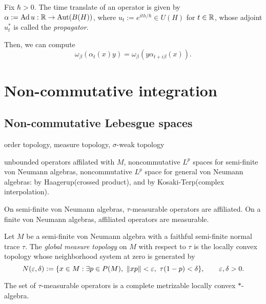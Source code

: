 \documentclass{../../large}
\begin{document}
Fix $\hbar>0$.
The time translate of an operator is given by $\alpha:=\operatorname{Ad} u:\mathbb{R}\to\operatorname{Aut}(B(H))$, where $u_t:=e^{ith/\hbar}\in U(H)$ for $t\in\mathbb{R}$, whose adjoint $u_t^*$ is called the \emph{propagator}.

Then, we can compute
\[\omega_\beta(\alpha_t(x)y)=\omega_\beta(y\alpha_{t+i\beta}(x)).\]










\chapter{Non-commutative integration}





\section{Non-commutative Lebesgue spaces}





\begin{prb}


order topology, measure topology, $\sigma$-weak topology


unbounded operators affilated with $M$,
noncommutative $L^p$ spaces for semi-finite von Neumann algebras,
noncommutative $L^p$ space for general von Neumann algebras: by Haagerup(crossed product), and by Kosaki-Terp(complex interpolation).

On semi-finite von Neumann algebras, $\tau$-measurable operators are affiliated.
On a finite von Neumann algebras, affiliated operators are measurable.


\end{prb}

\begin{prb}
Let $M$ be a semi-finite von Neumann algebra with a faithful semi-finite normal trace $\tau$.
The \emph{global measure topology} on $M$ with respect to $\tau$ is the locally convex topology whose neighborhood system at zero is generated by
\[N(\e,\delta):=\{x\in M:\exists p\in P(M),\ \|xp\|<\e,\ \tau(1-p)<\delta\},\qquad\e,\delta>0.\]

The set of $\tau$-measurable operators is a complete metrizable locally convex $*$-algebra.
\end{prb}
\end{document}
